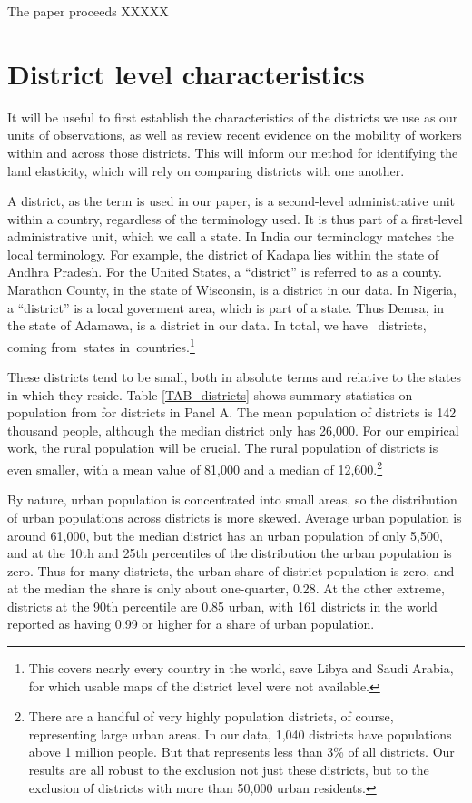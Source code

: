 \documentclass[11pt]{article}
\begin{document}
The paper proceeds XXXXX

\section{District level characteristics}
It will be useful to first establish the characteristics of the districts we use as our units of observations, as well as review recent evidence on the mobility of workers within and across those districts. This will inform our method for identifying the land elasticity, which will rely on comparing districts with one another.

A district, as the term is used in our paper, is a second-level administrative unit within a country, regardless of the terminology used. It is thus part of a first-level administrative unit, which we call a state. In India our terminology matches the local terminology. For example, the district of Kadapa lies within the state of Andhra Pradesh. For the United States, a ``district'' is referred to as a county. Marathon County, in the state of Wisconsin, is a district in our data. In Nigeria, a ``district'' is a local goverment area, which is part of a state. Thus Demsa, in the state of Adamawa, is a district in our data. In total, we have \districts \ districts, coming from\provinces \ states in\countries \ countries.\footnote{This covers nearly every country in the world, save Libya and Saudi Arabia, for which usable maps of the district level were not available.}

These districts tend to be small, both in absolute terms and relative to the states in which they reside. Table \ref{TAB_districts} shows summary statistics on population from \cite{hyde31} for districts in Panel A. The mean population of districts is 142 thousand people, although the median district only has 26,000. For our empirical work, the rural population will be crucial. The rural population of districts is even smaller, with a mean value of 81,000 and a median of 12,600.\footnote{There are a handful of very highly population districts, of course, representing large urban areas. In our data, 1,040 districts have populations above 1 million people. But that represents less than 3\% of all districts. Our results are all robust to the exclusion not just these districts, but to the exclusion of districts with more than 50,000 urban residents.}

By nature, urban population is concentrated into small areas, so the distribution of urban populations across districts is more skewed. Average urban population is around 61,000, but the median district has an urban population of only 5,500, and at the 10th and 25th percentiles of the distribution the urban population is zero. Thus for many districts, the urban share of district population is zero, and at the median the share is only about one-quarter, 0.28. At the other extreme, districts at the 90th percentile are 0.85 urban, with 161 districts in the world reported as having 0.99 or higher for a share of urban population. 
\end{document}
